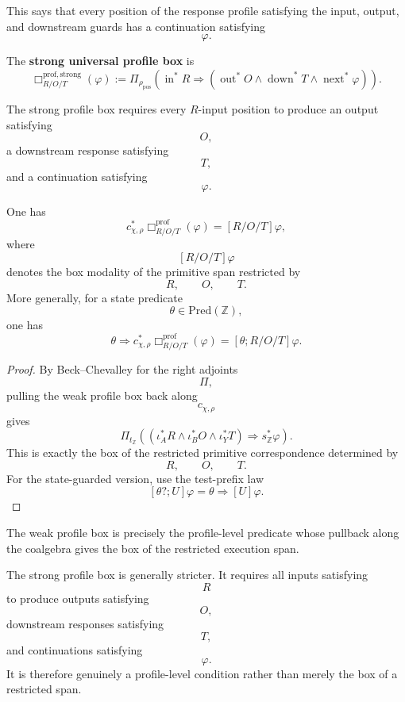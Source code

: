 This says that every position of the response profile satisfying the input,
output, and downstream guards has a continuation satisfying
\[
\varphi.
\]

\begin{definition}
\label{def:derived-poly-strong-profile-box}
The \textbf{strong universal profile box} is
\[
\Box^{\mathrm{prof,strong}}_{R/O/T}(\varphi)
:=
\Pi_{\rho_{\mathrm{pos}}}
\left(
\operatorname{in}^{\ast}R
\Rightarrow
(
\operatorname{out}^{\ast}O
\wedge
\operatorname{down}^{\ast}T
\wedge
\operatorname{next}^{\ast}\varphi
)
\right).
\]
\end{definition}

The strong profile box requires every \(R\)-input position to produce an
output satisfying
\[
O,
\]
a downstream response satisfying
\[
T,
\]
and a continuation satisfying
\[
\varphi.
\]

\begin{theorem}
\label{thm:derived-poly-weak-profile-box-span-box}
One has
\[
c_{\chi,\rho}^{\ast}
\Box^{\mathrm{prof}}_{R/O/T}(\varphi)
=
[R/O/T]\varphi,
\]
where
\[
[R/O/T]\varphi
\]
denotes the box modality of the primitive span restricted by
\[
R,
\qquad
O,
\qquad
T.
\]
More generally, for a state predicate
\[
\theta\in\mathrm{Pred}(\mathbb Z),
\]
one has
\[
\theta\Rightarrow
c_{\chi,\rho}^{\ast}
\Box^{\mathrm{prof}}_{R/O/T}(\varphi)
=
[\theta;R/O/T]\varphi.
\]
\end{theorem}

\begin{proof}
By Beck--Chevalley for the right adjoints
\[
\Pi,
\]
pulling the weak profile box back along
\[
c_{\chi,\rho}
\]
gives
\[
\Pi_{t_{\mathbb Z}}
\left(
(
\iota_A^\ast R
\wedge
\iota_B^\ast O
\wedge
\iota_Y^\ast T
)
\Rightarrow
s_{\mathbb Z}^{\ast}\varphi
\right).
\]
This is exactly the box of the restricted primitive correspondence determined
by
\[
R,
\qquad
O,
\qquad
T.
\]
For the state-guarded version, use the test-prefix law
\[
[\theta?;U]\varphi
=
\theta\Rightarrow[U]\varphi.
\]
\end{proof}

\begin{remark}
\label{rem:derived-poly-weak-strong-profile-boxes}
The weak profile box is precisely the profile-level predicate whose pullback
along the coalgebra gives the box of the restricted execution span.

The strong profile box is generally stricter.  It requires all inputs
satisfying
\[
R
\]
to produce outputs satisfying
\[
O,
\]
downstream responses satisfying
\[
T,
\]
and continuations satisfying
\[
\varphi.
\]
It is therefore genuinely a profile-level condition rather than merely the
box of a restricted span.
\end{remark}

